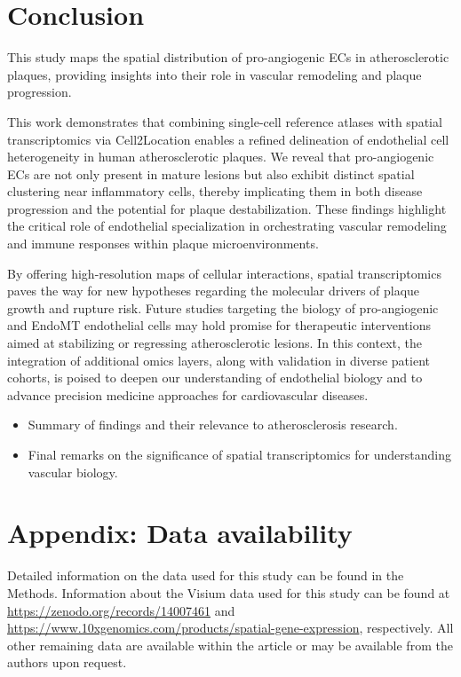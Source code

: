 \documentclass[a4paper,12pt]{article}
\begin{document}
\section{Conclusion}
This study maps the spatial distribution of pro-angiogenic ECs in atherosclerotic plaques, providing insights into their role in vascular remodeling and plaque progression.

This work demonstrates that combining single-cell reference atlases with spatial transcriptomics via Cell2Location enables a refined delineation of endothelial cell heterogeneity in human atherosclerotic plaques. We reveal that pro-angiogenic ECs are not only present in mature lesions but also exhibit distinct spatial clustering near inflammatory cells, thereby implicating them in both disease progression and the potential for plaque destabilization. These findings highlight the critical role of endothelial specialization in orchestrating vascular remodeling and immune responses within plaque microenvironments.

By offering high-resolution maps of cellular interactions, spatial transcriptomics paves the way for new hypotheses regarding the molecular drivers of plaque growth and rupture risk. Future studies targeting the biology of pro-angiogenic and EndoMT endothelial cells may hold promise for therapeutic interventions aimed at stabilizing or regressing atherosclerotic lesions. In this context, the integration of additional omics layers, along with validation in diverse patient cohorts, is poised to deepen our understanding of endothelial biology and to advance precision medicine approaches for cardiovascular diseases.

\begin{itemize}
  \item Summary of findings and their relevance to atherosclerosis research.
  \item Final remarks on the significance of spatial transcriptomics for understanding vascular biology.
\end{itemize}




\newpage
\appendix
\section{Appendix: Data availability}  
Detailed information on the data used for this study can be found in the Methods. Information about the Visium data used for this study can be found at \url{https://zenodo.org/records/14007461} and \url{https://www.10xgenomics.com/products/spatial-gene-expression}, respectively. All other remaining data are available within the article or may be available from the authors upon request.  
\end{document}
